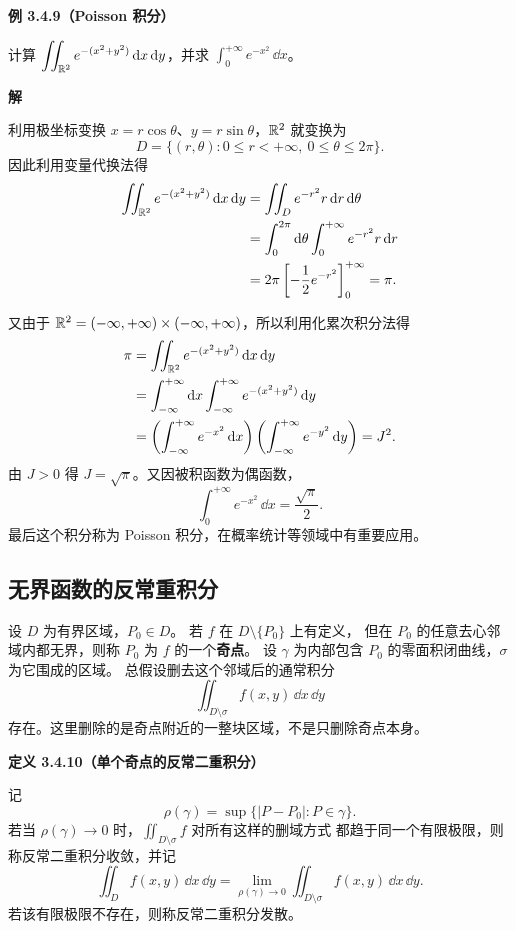\textbf{例 3.4.9（Poisson 积分）}


计算 $\displaystyle\iint_{\mathbb{R}^2}e^{-(x^2+y^2)}\,\mathrm{d} x\,\mathrm{d} y$，并求
$\displaystyle\int_0^{+\infty}e^{-x^2}\,\dd x$。





\textbf{解}

利用极坐标变换 $x=r\cos\theta$、$y=r\sin\theta$，$\mathbb{R}^2$ 就变换为
\[
D=\{(r,\theta):0\le r<+\infty,\ 0\le\theta\le2\pi\}.
\]
因此利用变量代换法得
\begin{align*}
\displaystyle\iint_{\mathbb{R}^2}e^{-(x^2+y^2)}\,\mathrm{d} x\,\mathrm{d} y
&=\displaystyle\iint_D e^{-r^2}r\,\mathrm{d} r\,\mathrm{d}\theta\\
&=\int_0^{2\pi}\mathrm{d}\theta\int_0^{+\infty}e^{-r^2}r\,\mathrm{d} r\\
&=2\pi\left[-\frac12e^{-r^2}\right]_0^{+\infty}=\pi.
\end{align*}


又由于 $\mathbb{R}^2=(-\infty,+\infty)\times(-\infty,+\infty)$，所以利用化累次积分法得
\begin{align*}
\pi
&=\displaystyle\iint_{\mathbb{R}^2}e^{-(x^2+y^2)}\,\mathrm{d} x\,\mathrm{d} y\\
&=\int_{-\infty}^{+\infty}\mathrm{d} x\int_{-\infty}^{+\infty}
 e^{-(x^2+y^2)}\,\mathrm{d} y\\
&=\left(\int_{-\infty}^{+\infty}e^{-x^2}\,\mathrm{d} x\right)
  \left(\int_{-\infty}^{+\infty}e^{-y^2}\,\mathrm{d} y\right)=J^2.
\end{align*}
由 $J>0$ 得 $J=\sqrt\pi$。又因被积函数为偶函数，
\[
\int_0^{+\infty}e^{-x^2}\,\dd x=\frac{\sqrt\pi}{2}.
\]
最后这个积分称为 Poisson 积分，在概率统计等领域中有重要应用。




\subsection*{无界函数的反常重积分}

设 $D$ 为有界区域，$P_0\in D$。
若 $f$ 在 $D\setminus\{P_0\}$ 上有定义，
但在 $P_0$ 的任意去心邻域内都无界，则称 $P_0$ 为 $f$ 的一个\textbf{奇点}。
设 $\gamma$ 为内部包含 $P_0$ 的零面积闭曲线，$\sigma$ 为它围成的区域。
总假设删去这个邻域后的通常积分
\[
\displaystyle\iint_{D\setminus\sigma}f(x,y)\,\dd x\,\dd y
\]
存在。这里删除的是奇点附近的一整块区域，不是只删除奇点本身。



\textbf{定义 3.4.10（单个奇点的反常二重积分）}


记
\[
\rho(\gamma)=\sup\{|P-P_0|:P\in\gamma\}.
\]
若当 $\rho(\gamma)\to0$ 时，$\displaystyle\iint_{D\setminus\sigma}f$ 对所有这样的删域方式
都趋于同一个有限极限，则称反常二重积分收敛，并记
\[
\displaystyle\iint_Df(x,y)\,\dd x\,\dd y
=\lim_{\rho(\gamma)\to0}\displaystyle\iint_{D\setminus\sigma}f(x,y)\,\dd x\,\dd y.
\]
若该有限极限不存在，则称反常二重积分发散。




